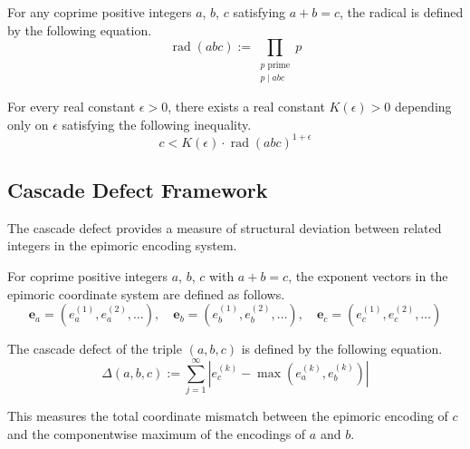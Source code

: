 \begin{conjecture}
\label{conj:abc-conjecture}
For any coprime positive integers $a$, $b$, $c$ satisfying $a + b = c$, the radical is defined by the following equation.
\begin{equation}
\label{eq:radical-definition}
\operatorname{rad}(abc) := \prod_{\substack{p \text{ prime} \\ p \mid abc}} p
\end{equation}

For every real constant $\epsilon > 0$, there exists a real constant $K(\epsilon) > 0$ depending only on $\epsilon$ satisfying the following inequality.
\begin{equation}
\label{eq:abc-inequality}
c < K(\epsilon) \cdot \operatorname{rad}(abc)^{1 + \epsilon}
\end{equation}
\end{conjecture}

\subsection{Cascade Defect Framework}
\label{subsec:cascade-defect-framework}

The cascade defect provides a measure of structural deviation between related integers in the epimoric encoding system.

\begin{definition}
\label{def:cascade-defect-triple}
For coprime positive integers $a$, $b$, $c$ with $a + b = c$, the exponent vectors in the epimoric coordinate system are defined as follows.
\begin{equation}
\mathbf{e}_a = (e_a^{(1)}, e_a^{(2)}, \ldots), \quad \mathbf{e}_b = (e_b^{(1)}, e_b^{(2)}, \ldots), \quad \mathbf{e}_c = (e_c^{(1)}, e_c^{(2)}, \ldots)
\end{equation}

The cascade defect of the triple $(a,b,c)$ is defined by the following equation.
\begin{equation}
\label{eq:triple-defect}
\Delta(a,b,c) := \sum_{j=1}^{\infty} \left| e_c^{(k)} - \max(e_a^{(k)}, e_b^{(k)}) \right|
\end{equation}

This measures the total coordinate mismatch between the epimoric encoding of $c$ and the componentwise maximum of the encodings of $a$ and $b$.
\end{definition}

